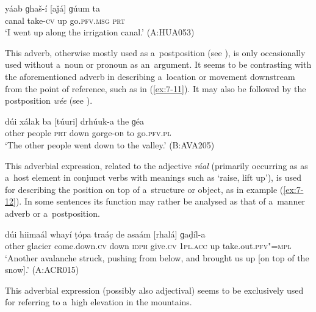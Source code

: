 \begin{exe}
\ex
\label{ex:7-10}
\gll yáab ɡhaš-í [aǰá] ɡúum ta  \\
canal take-\textsc{cv} up go.\textsc{pfv.msg} \textsc{prt} \\
\glt `I went up along the irrigation canal.' (A:HUA053)
\end{exe}

 This adverb, otherwise mostly used as a~postposition (see ), is only occasionally used without a~noun or pronoun as an~argument. It seems to be contrasting with the aforementioned adverb in describing a~location or movement downstream from the point of reference, such as in (\ref{ex:7-11}). It may also be followed by the postposition \textit{wée} (see ). 

\begin{exe}
\ex
\label{ex:7-11}
\gll dúi xálak ba [túuri] drhúuk-a the ɡéa  \\
other people \textsc{prt} down gorge-\textsc{ob}  to go.\textsc{pfv.pl} \\
\glt `The other people went down to the valley.' (B:AVA205)
\end{exe}

 This adverbial expression, related to the adjective \textit{ráal} (primarily occurring as as a~host element in conjunct verbs with meanings such as `raise, lift up'), is used for describing the position on top of a~structure or object, as in example (\ref{ex:7-12}). In some sentences its function may rather be analysed as that of a~manner adverb or a~postposition.

\begin{exe}
\ex
\label{ex:7-12}
\gll dúi hiimaál whayí ṭópa traác̣ de asaám  [rhalá] ɡaḍíl-a\\
other glacier come.down.\textsc{cv} down \textsc{idph} give.\textsc{cv} \textsc{1pl.acc} up take.out.\textsc{pfv"=mpl}\\
\glt `Another avalanche struck, pushing from below, and brought us up [on top of the snow].' (A:ACR015)
\end{exe}

 This adverbial expression (possibly also adjectival) seems to be exclusively used for referring to a~high elevation in the mountains.


